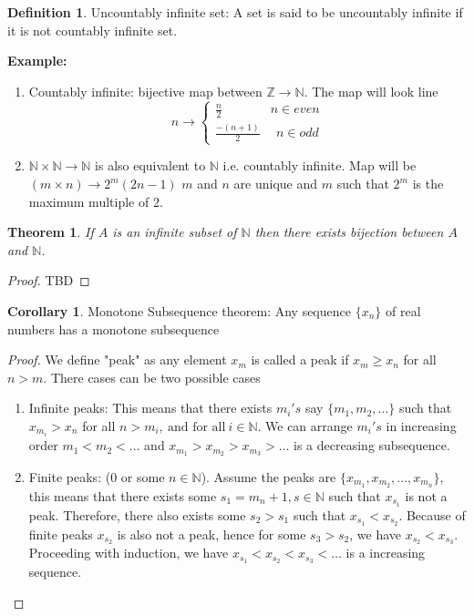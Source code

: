 \documentclass[12pt]{report}
\newtheorem{thm}{Theorem}
\theoremstyle{definition}
\newtheorem{defn}{Definition}
\newtheorem{cor}{Corollary}
\begin{document}
\begin{defn}
    Uncountably infinite set: A set is said to be uncountably infinite if it is not countably infinite set. 
\end{defn}
\textbf{Example:} 
\begin{enumerate}
    \item Countably infinite: bijective map between $\mathbb{Z} \to \mathbb{N}.$ The map will look line
    $$ 
    n\to \begin{cases}
            \frac{n}{2}& n\in even\\
            \frac{-(n+1)}{2}&~~ n \in odd    
         \end{cases}
    $$
    \item $\mathbb{N} \times \mathbb{N} \to \mathbb{N}$ is also equivalent to $\mathbb{N}$ i.e. countably infinite. Map will be $ (m \times n) \to 2^m(2n-1)$ $m$ and $n$ are unique and $m$ such that $2^m$ is the maximum multiple of $2$.
\end{enumerate}
\begin{thm}
    If $A$ is an infinite subset of $\mathbb{N}$ then there exists bijection between $A$ and $\mathbb{N}$.
\end{thm}
\begin{proof}
    TBD
\end{proof}
\begin{cor}
    Monotone Subsequence theorem: Any sequence $\{x_n\}$ of real numbers has a monotone subsequence
\end{cor}
\begin{proof}
    We define "peak" as any element $x_m$ is called a peak if $x_m\geq x_n$ for all $n > m$. There cases can be two possible cases
    \begin{enumerate}
        \item Infinite peaks: This means that there exists $m_i's$ say $\{m_1, m_2, \dots\}$ such that $x_{m_i} > x_n$ for all $n> m_i ,~\text{and for all}~i \in \mathbb{N}$. We can arrange $m_i's$ in increasing order $m_1 < m_2 < \dots$ and $x_{m_1} > x_{m_2} > x_{m_3} > \dots$ is a decreasing subsequence.
        \item Finite peaks: ($0$ or some $n \in \mathbb{N}$). Assume the peaks are $ \{x_{m_1}, x_{m_2} , \dots, x_{m_n}\}$, this means that there exists some $s_1 = m_n+1, s \in \mathbb{N}$ such that $x_{s_1}$ is not a peak. Therefore, there also exists some $s_2 > s_1$ such that $x_{s_1} < x_{s_2}$. Because of finite peaks $x_{s_2}$ is also not a peak, hence for some $s_3 > s_2$, we have $x_{s_2} < x_{s_3}$. Proceeding with induction, we have $x_{s_1} < x_{s_2} < x_{s_3} < \dots$ is a increasing sequence. 
    \end{enumerate}
\end{proof}
\end{document}
